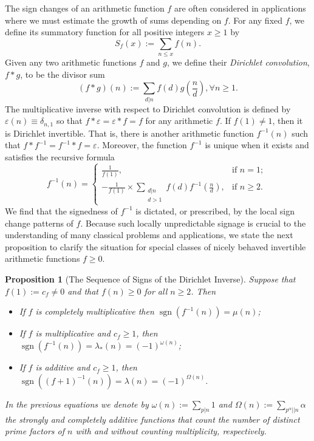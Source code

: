 \documentclass[11pt,reqno]{amsart}
\numberwithin{figure}{section}
\numberwithin{table}{section}
\DeclareMathOperator{\sgn}{sgn}
\theoremstyle{plain}
\newtheorem{prop}[theorem]{Proposition}
\numberwithin{theorem}{section}
\theoremstyle{definition}
\begin{document}
The sign changes of an arithmetic function $f$ are often considered in applications 
where we must estimate the growth of sums depending on $f$. For any fixed $f$, we 
define its summatory function for all positive integers $x \geq 1$ by 
\[
S_f(x) := \sum_{n \leq x} f(n). 
\]
Given any two arithmetic functions $f$ and $g$, we define their 
\emph{Dirichlet convolution}, $f \ast g$, to be the divisor sum 
\[
(f \ast g)(n) := \sum_{d|n} f(d) g\left(\frac{n}{d}\right), \forall n \geq 1. 
\] 
The multiplicative inverse with respect to Dirichlet convolution is defined by 
$\varepsilon(n) \equiv \delta_{n,1}$ so that $f \ast \varepsilon = \varepsilon \ast f = f$ for 
any arithmetic $f$. If $f(1) \neq 1$, then it is Dirichlet invertible. That is, there is another 
arithmetic function $f^{-1}(n)$ such that $f \ast f^{-1} = f^{-1} \ast f = \varepsilon$. 
Moreover, the function $f^{-1}$ is unique when it exists and satisfies the recursive formula 
\[
f^{-1}(n) = \begin{cases} 
     \frac{1}{f(1)}, & \text{if $n = 1$; } \\ 
     -\frac{1}{f(1)} \times \sum\limits_{\substack{d|n \\ d>1}} 
     f(d) f^{-1}\left(\frac{n}{d}\right), & \text{if $n \geq 2$. } 
     \end{cases} 
\]
We find that the signedness of $f^{-1}$ is dictated, or prescribed, by the local 
sign change patterns of $f$. 
Because such locally unpredictable signage is crucial to the understanding of many 
classical problems and applications, we state the next proposition to 
clarify the situation for special classes of nicely behaved invertible arithmetic functions 
$f \geq 0$. 

\begin{prop}[The Sequence of Signs of the Dirichlet Inverse] 
\label{prop_SeqOfSignsOfDirInv_SpCases_stmt_intro_v1} 
Suppose that $f(1) := c_f \neq 0$ and that $f(n) \geq 0$ for all $n \geq 2$. Then 
\begin{itemize} 

\item[1.] If $f$ is completely multiplicative then $\sgn(f^{-1}(n)) = \mu(n)$; 
\item[2.] If $f$ is multiplicative and $c_f \geq 1$, then 
          $\sgn(f^{-1}(n)) = \lambda_{\ast}(n) = (-1)^{\omega(n)}$; 
\item[3.] If $f$ is additive and $c_f \geq 1$, then 
          $\sgn((f+1)^{-1}(n)) = \lambda(n) = (-1)^{\Omega(n)}$. 

\end{itemize} 
In the previous equations we denote by $\omega(n) := \sum_{p|n} 1$ and 
$\Omega(n) := \sum_{p^{\alpha} || n} \alpha$ the 
strongly and completely additive functions that count the number of distinct prime factors 
of $n$ with and without counting multiplicity, respectively. 
\end{prop} 
\end{document}
